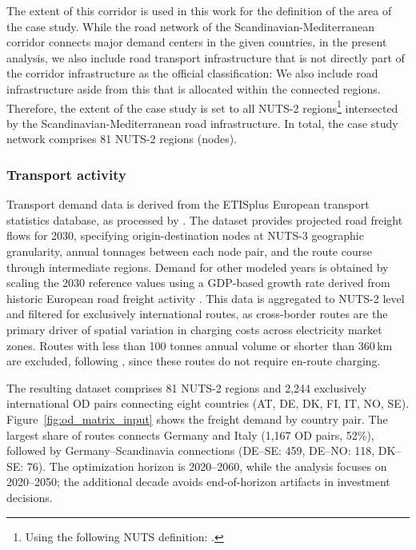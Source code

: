         The extent of this corridor is used in this work for the definition of the area of the case study. While the road network of the Scandinavian-Mediterranean corridor connects major demand centers in the given countries, in the present analysis, we also include road transport infrastructure that is not directly part of the corridor infrastructure as the official classification: We also include road infrastructure aside from this that is allocated within the connected regions. Therefore, the extent of the case study is set to all NUTS-2 regions\footnote{Using the following NUTS definition: \citep{EU_Eurostat_NUTS}.} intersected by the Scandinavian-Mediterranean road infrastructure. In total, the case study network comprises 81 NUTS-2 regions (nodes).

    \subsubsection{Transport activity}
    \label{sec:transport_activity_rq3}

        Transport demand data is derived from the ETISplus European transport statistics database, as processed by \citet{Speth2021}. The dataset provides projected road freight flows for 2030, specifying origin-destination nodes at NUTS-3 geographic granularity, annual tonnages between each node pair, and the route course through intermediate regions. Demand for other modeled years is obtained by scaling the 2030 reference values using a GDP-based growth rate derived from historic European road freight activity \citep{eurostat2024roadfreight}. This data is aggregated to NUTS-2 level and filtered for exclusively international routes, as cross-border routes are the primary driver of spatial variation in charging costs across electricity market zones. Routes with less than 100 tonnes annual volume or shorter than 360\,km are excluded, following \citet{SHOMAN2023103825}, since these routes do not require en-route charging.

        The resulting dataset comprises 81 NUTS-2 regions and 2,244 exclusively international \ac{OD} pairs connecting eight countries (AT, DE, DK, FI, IT, NO, SE). Figure~\ref{fig:od_matrix_input} shows the freight demand by country pair. The largest share of routes connects Germany and Italy (1,167 \ac{OD} pairs, 52\%), followed by Germany--Scandinavia connections (DE--SE: 459, DE--NO: 118, DK--SE: 76). The optimization horizon is 2020--2060, while the analysis focuses on 2020--2050; the additional decade avoids end-of-horizon artifacts in investment decisions.

